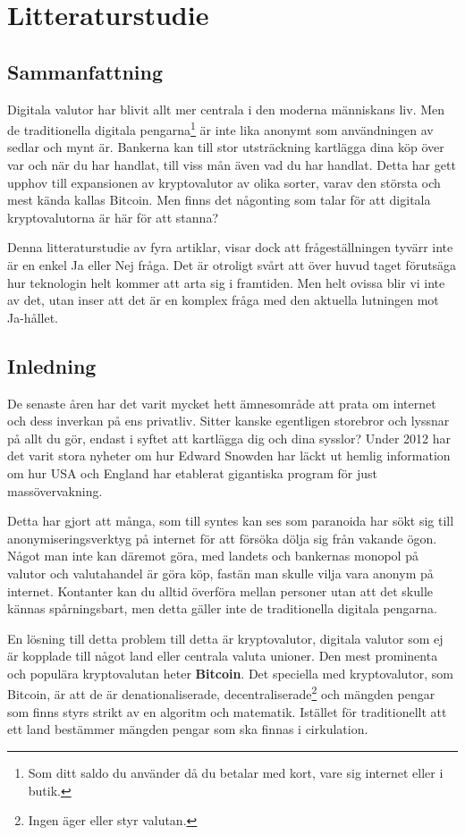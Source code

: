 \documentclass[a4paper,11pt,exjobb]{kth-mag}
\begin{document}
\chapter{Litteraturstudie}
\section{Sammanfattning}
Digitala valutor har blivit allt mer centrala i den moderna människans liv. Men de traditionella digitala pengarna\footnote{Som ditt saldo du använder då du betalar med kort, vare sig internet eller i butik.} är inte lika anonymt som användningen av sedlar och mynt är. Bankerna kan till stor utsträckning kartlägga dina köp över var och när du har handlat, till viss mån även vad du har handlat. Detta har gett upphov till expansionen av kryptovalutor av olika sorter, varav den största och mest kända kallas Bitcoin. Men finns det någonting som talar för att digitala kryptovalutorna är här för att stanna?

Denna litteraturstudie av fyra artiklar, visar dock att frågeställningen tyvärr inte är en enkel Ja eller Nej fråga. Det är otroligt svårt att över huvud taget förutsäga hur teknologin helt kommer att arta sig i framtiden. Men helt ovissa blir vi inte av det, utan inser att det är en komplex fråga med den aktuella lutningen mot Ja-hållet.

\section{Inledning}
De senaste åren har det varit mycket hett ämnesområde att prata om internet och dess inverkan på ens privatliv. Sitter kanske egentligen storebror och lyssnar på allt du gör, endast i syftet att kartlägga dig och dina sysslor? Under 2012 har det varit stora nyheter om hur Edward Snowden har läckt ut hemlig information om hur USA och England har etablerat gigantiska program för just massövervakning. 

Detta har gjort att många, som till syntes kan ses som paranoida har sökt sig till anonymiseringsverktyg på internet för att försöka dölja sig från vakande ögon. Något man inte kan däremot göra, med landets och bankernas monopol på valutor och valutahandel är göra köp, fastän man skulle vilja vara anonym på internet. Kontanter kan du alltid överföra mellan personer utan att det skulle kännas spårningsbart, men detta gäller inte de traditionella digitala pengarna.

En lösning till detta problem till detta är kryptovalutor, digitala valutor som ej är kopplade till något land eller centrala valuta unioner. Den mest prominenta och populära kryptovalutan heter \textbf{Bitcoin}. Det speciella med kryptovalutor, som Bitcoin, är att de är denationaliserade, decentraliserade\footnote{Ingen äger eller styr valutan.} och mängden pengar som finns styrs strikt av en algoritm och matematik. Istället för traditionellt att ett land bestämmer mängden pengar som ska finnas i cirkulation.
\end{document}
